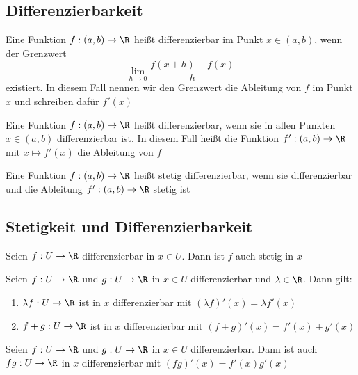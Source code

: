 	\subsection{Differenzierbarkeit}
		\begin{Definition} 
			Eine Funktion $f: (a, b)\to \R$ heißt differenzierbar im Punkt $x\in (a, b)$, wenn der Grenzwert
			$$
				\lim_{h\to 0}\frac{f(x+h)-f(x)}{h}
			$$
			existiert. In diesem Fall nennen wir den Grenzwert die Ableitung von $f$ im Punkt $x$ und schreiben dafür $f'(x)$ 
		\end{Definition}
		\begin{Definition} [ Differenzierbar]
			Eine Funktion $f: (a, b)\to \R$ heißt differenzierbar, wenn sie in allen Punkten $x\in(a, b)$ differenzierbar ist. In diesem Fall heißt die Funktion $f': (a, b) \to \R$ mit $x\mapsto f'(x)$ die Ableitung von $f$
		\end{Definition}
		\begin{Definition} 
			Eine Funktion $f: (a, b)\to \R$ heißt stetig differenzierbar, wenn sie differenzierbar und die Ableitung $f': (a, b)\to\R$ stetig ist
		\end{Definition}
	\subsection{Stetigkeit und Differenzierbarkeit}
		\begin{Satz} [ ]
			Seien $f: U\to\R$ differenzierbar in $x\in U$. Dann ist $f$ auch stetig in $x$
		\end{Satz}	
		\begin{Satz} [ Rechenregeln]
				Seien $f: U\to \R$ und $g: U\to \R$ in $x\in U$ differenzierbar und $\lambda\in\R$. Dann gilt:
				\begin{enumerate}
						\item $\lambda f: U\to\R$ ist in $x$ differenzierbar mit $(\lambda f)'(x)=\lambda f'(x)$
						\item $f+g: U\to \R$ ist in $x$ differenzierbar mit $(f+g)'(x)=f'(x)+g'(x)$
				\end{enumerate}
		\end{Satz}
		\begin{Satz} [ Produktregel]
			Seien $f: U\to\R$ und $g: U\to\R$ in $x\in U$ differenzierbar. Dann ist auch $fg: U\to \R$ in $x$ differenzierbar mit $(fg)'(x)=f'(x)g'(x)$
		\end{Satz}
			
			
			
			
			
